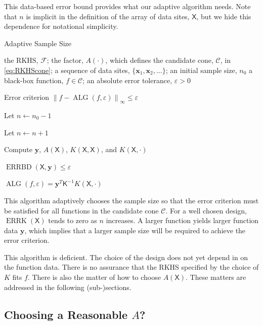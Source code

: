\documentclass[]{mcom-l}
\theoremstyle{plain}
\theoremstyle{definition}
\DeclareMathOperator{\ALG}{ALG}
\DeclareMathOperator{\errK}{ERRK}
\DeclareMathOperator{\errBd}{ERRBD}
\newcommand{\mK}{\mathsf{K}}
\newcommand{\mX}{\mathsf{X}}
\newcommand{\bx}{{\boldsymbol{x}}}
\newcommand{\by}{{\boldsymbol{y}}}
\newcommand{\cc}{\mathcal{C}}
\newcommand{\calf}{{\mathcal{F}}}
\newcommand{\norm}[2][{}]{\ensuremath{\left \lVert #2 \right \rVert}_{#1}}
\begin{document}
This data-based error bound provides what  our adaptive algorithm needs.  Note that $n$ is implicit in the definition of the array of data sites, $\mX$, but we hide this dependence for notational simplicity.

\begin{algorithm}[H]
\caption{Adaptive Sample Size \label{alg:basicadapt}}
	\begin{algorithmic}
	\PARAM the RKHS, $\calf$; the factor, $A(\cdot)$, which defines  the candidate cone, $\cc$, in \eqref{eq:RKHScone};  a sequence of data sites, $\{\bx_1, \bx_2, \ldots \}$; an initial sample size, $n_0$
	\INPUT a black-box function, $f \in \cc$; an absolute error tolerance, $\varepsilon>0$

    \Ensure Error criterion $\norm[\infty]{f - \ALG(f,\varepsilon)} \le \varepsilon$

   \State Let $n \leftarrow n_0 -1$

\Repeat

\State Let $n \leftarrow n + 1$

\State Compute $\by$, $A(\mX)$, $K(\mX,\mX)$, and $K(\mX,\cdot)$

\Until $\errBd(\mX,\by) \le \varepsilon$

\RETURN $\ALG(f,\varepsilon) = \by^T \mK^{-1} K(\mX,\cdot)$

\end{algorithmic}
\end{algorithm}

This algorithm adaptively chooses the sample size so that the error criterion must be satisfied for all functions in the candidate cone $\cc$.  For a well chosen design, $\errK(\mX)$ tends to zero as $n$ increases.  A larger function yields larger function data $\by$, which implies that a larger sample size will be required to achieve the error criterion.

This algorithm is deficient.  The choice of the design does not yet depend in on the function data.  There is no assurance that the RKHS specified by the choice of $K$ fits $f$.  There is also the matter of how to choose $A(\mX)$.  These matters are addressed in the following (sub-)sections.


\subsection{Choosing a Reasonable $A$?}
\end{document}
